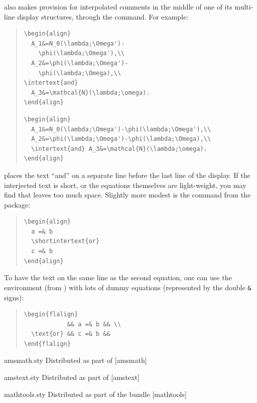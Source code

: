 \AMSLaTeX{} also makes provision for interpolated comments in the
middle of one of its multi-line display structures, through the
 command.  For example:
\begin{quote}
\begin{narrowversion}
\begin{verbatim}
\begin{align}
  A_1&=N_0(\lambda;\Omega')-
    \phi(\lambda;\Omega'),\\
  A_2&=\phi(\lambda;\Omega')-
    \phi(\lambda;\Omega),\\
\intertext{and}
  A_3&=\mathcal{N}(\lambda;\omega).
\end{align}
\end{verbatim}
\end{narrowversion}
\begin{wideversion}
\begin{verbatim}
\begin{align}
  A_1&=N_0(\lambda;\Omega')-\phi(\lambda;\Omega'),\\
  A_2&=\phi(\lambda;\Omega')-\phi(\lambda;\Omega),\\
  \intertext{and} A_3&=\mathcal{N}(\lambda;\omega).
\end{align}
\end{verbatim}
\end{wideversion}
\end{quote}
places the text ``and'' on a separate line before the last line of the
display.  If the interjected text is short, or the equations
themselves are light-weight, you may find that  leaves
too much space.  Slightly more modest is the 
command from the  package:
\begin{quote}
\begin{verbatim}
\begin{align}
  a =& b
  \shortintertext{or}
  c =& b
\end{align}
\end{verbatim}
\end{quote}
To have the text on the same line as the second equation, one can use
the  environment (from )
with lots of dummy equations (represented by the double \texttt{\&}
signs):
\begin{quote}
\begin{verbatim}
\begin{flalign}
            && a =& b && \\
  \text{or} && c =& b &&
\end{flalign}
\end{verbatim}
\end{quote}
\begin{ctanrefs}
\item[amsmath.sty]Distributed as part of \AMSLaTeX{}
  [amsmath]
\item[amstext.sty]Distributed as part of \AMSLaTeX{}
  [amstext]
\item[mathtools.sty]Distributed as part of the  bundle
  [mathtools]
\end{ctanrefs}

